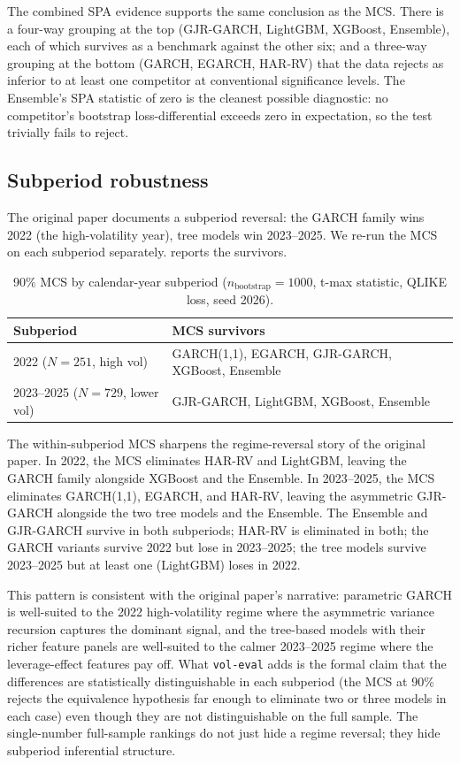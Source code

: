 The combined SPA evidence supports the same conclusion as the MCS. There is a four-way grouping at the top (GJR-GARCH, LightGBM, XGBoost, Ensemble), each of which survives as a benchmark against the other six; and a three-way grouping at the bottom (GARCH, EGARCH, HAR-RV) that the data rejects as inferior to at least one competitor at conventional significance levels. The Ensemble's SPA statistic of zero is the cleanest possible diagnostic: no competitor's bootstrap loss-differential exceeds zero in expectation, so the test trivially fails to reject.

\subsection{Subperiod robustness}

The original paper documents a subperiod reversal: the GARCH family wins 2022 (the high-volatility year), tree models win 2023--2025. We re-run the MCS on each subperiod separately.  reports the survivors.

\begin{table}[H]
\centering
\small
\caption{90\% MCS by calendar-year subperiod ($n_{\text{bootstrap}}=1000$, t-max statistic, QLIKE loss, seed 2026).}
\label{tab:demo_subperiod_mcs}
\begin{tabular}{@{}l p{8.5cm}@{}}
\toprule
\textbf{Subperiod} & \textbf{MCS survivors} \\
\midrule
2022 ($N=251$, high vol) & GARCH(1,1), EGARCH, GJR-GARCH, XGBoost, Ensemble \\
2023--2025 ($N=729$, lower vol) & GJR-GARCH, LightGBM, XGBoost, Ensemble \\
\bottomrule
\end{tabular}
\end{table}

The within-subperiod MCS sharpens the regime-reversal story of the original paper. In 2022, the MCS eliminates HAR-RV and LightGBM, leaving the GARCH family alongside XGBoost and the Ensemble. In 2023--2025, the MCS eliminates GARCH(1,1), EGARCH, and HAR-RV, leaving the asymmetric GJR-GARCH alongside the two tree models and the Ensemble. The Ensemble and GJR-GARCH survive in both subperiods; HAR-RV is eliminated in both; the GARCH variants survive 2022 but lose in 2023--2025; the tree models survive 2023--2025 but at least one (LightGBM) loses in 2022.

This pattern is consistent with the original paper's narrative: parametric GARCH is well-suited to the 2022 high-volatility regime where the asymmetric variance recursion captures the dominant signal, and the tree-based models with their richer feature panels are well-suited to the calmer 2023--2025 regime where the leverage-effect features pay off. What \texttt{vol-eval} adds is the formal claim that the differences are statistically distinguishable in each subperiod (the MCS at 90\% rejects the equivalence hypothesis far enough to eliminate two or three models in each case) even though they are not distinguishable on the full sample. The single-number full-sample rankings do not just hide a regime reversal; they hide subperiod inferential structure.

